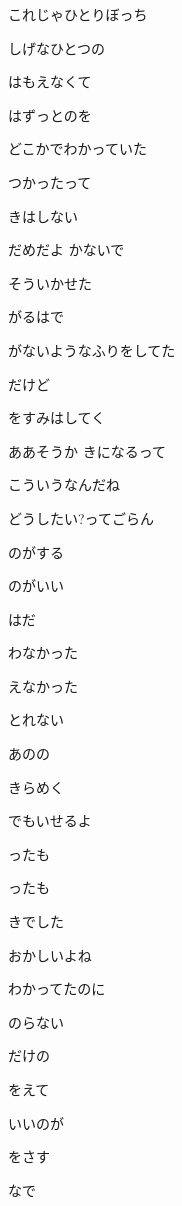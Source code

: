 \documentclass[14pt]{ltjsarticle}
\begin{document}
{  これじゃひとりぼっち
  \jisho{}

\item
  しげなひとつの
  \jisho{}

  はもえなくて
  \jisho{}

\item
  はずっとのを
  \jisho{}

  どこかでわかっていた
  \jisho{}

  つかったって
  \jisho{}

  きはしない
  \jisho{}

  だめだよ かないで
  \jisho{}

  そういかせた
  \jisho{}

\item
  がるはで
  \jisho{}

  がないようなふりをしてた
  \jisho{}

  だけど
  \jisho{}

  をすみはしてく
  \jisho{}

  ああそうか きになるって
  \jisho{}

  こういうなんだね
  \jisho{}

\item
  どうしたい?ってごらん
  \jisho{}

  のがする
  \jisho{}

  のがいい
  \jisho{}

  はだ
  \jisho{}

\item
  わなかった
  \jisho{}

  えなかった
  \jisho{}

  とれない
  \jisho{}

\item
  あのの
  \jisho{}

  きらめく
  \jisho{}

  でもいせるよ
  \jisho{}

  ったも
  \jisho{}

  ったも
  \jisho{}

  きでした
  \jisho{}

  おかしいよね
  \jisho{}

  わかってたのに
  \jisho{}

  のらない
  \jisho{}

  だけの
  \jisho{}

  をえて
  \jisho{}

  いいのが
  \jisho{}

  をさす
  \jisho{}

  なで
  \jisho{}


}
\end{document}
